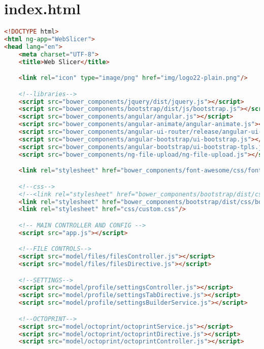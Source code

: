 \section{index.html}
\begin{lstlisting}[language=HTML, label={lst:index}, caption=As this is a single page web application this is the only HTML file. It contains all of the libraries needed to run all subsequent sections.]
<!DOCTYPE html>
<html ng-app="WebSlicer">
<head lang="en">
    <meta charset="UTF-8">
    <title>Web Slicer</title>

    <link rel="icon" type="image/png" href="img/logo22-plain.png"/>

    <!--libraries-->
    <script src="bower_components/jquery/dist/jquery.js"></script>
    <script src="bower_components/bootstrap/dist/js/bootstrap.js"></script>
    <script src="bower_components/angular/angular.js"></script>
    <script src="bower_components/angular-animate/angular-animate.js"></script>
    <script src="bower_components/angular-ui-router/release/angular-ui-router.js"></script>
    <script src="bower_components/angular-bootstrap/ui-bootstrap.js"></script>
    <script src="bower_components/angular-bootstrap/ui-bootstrap-tpls.js"></script>
    <script src="bower_components/ng-file-upload/ng-file-upload.js"></script>

    <link rel="stylesheet" href="bower_components/font-awesome/css/font-awesome.css">

    <!--css-->
    <!--<link rel="stylesheet" href="bower_components/bootstrap/dist/css/bootstrap.css">-->
    <link rel="stylesheet" href="bower_components/bootstrap/dist/css/bootstrap-cosmo.css">
    <link rel="stylesheet" href="css/custom.css"/>

    <!-- MAIN CONTROLLER AND CONFIG -->
    <script src="app.js"></script>

    <!--FILE CONTROLS-->
    <script src="model/files/filesController.js"></script>
    <script src="model/files/filesDirective.js"></script>

    <!--SETTINGS-->
    <script src="model/profile/settingsController.js"></script>
    <script src="model/profile/settingsTabDirective.js"></script>
    <script src="model/profile/settingsBuilderService.js"></script>

    <!--OCTOPRINT-->
    <script src="model/octoprint/octoprintService.js"></script>
    <script src="model/octoprint/octoprintDirective.js"></script>
    <script src="model/octoprint/octoprintController.js"></script>


\end{lstlisting}
